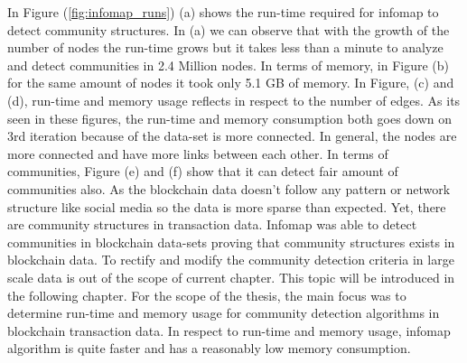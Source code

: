 In Figure (\ref{fig:infomap_runs}) (a) shows the run-time required for infomap to detect community structures. In (a) we can observe that with the growth of the number of nodes the run-time grows but it takes less than a minute to analyze and detect communities in 2.4 Million nodes. In terms of memory, in Figure (b) for the same amount of nodes it took only 5.1 GB of memory. In Figure, (c) and (d), run-time and memory usage reflects in respect to the number of edges. As its seen in these figures, the run-time and memory consumption both goes down on 3rd iteration because of the data-set is more connected. In general, the nodes are more connected and have more links between each other. In terms of communities, Figure (e) and (f) show that it can detect fair amount of communities also. As the blockchain data doesn't follow any pattern or network structure like social media so the data is more sparse than expected. Yet, there are community structures in transaction data. Infomap was able to detect communities in blockchain data-sets proving that community structures exists in blockchain data. To rectify and modify the community detection criteria in large scale data is out of the scope of current chapter. This topic will be introduced in the following chapter. For the scope of the thesis, the main focus was to determine run-time and memory usage for community detection algorithms in blockchain transaction data. In respect to run-time and memory usage, infomap algorithm is quite faster and has a reasonably low memory consumption. 
\vfill

